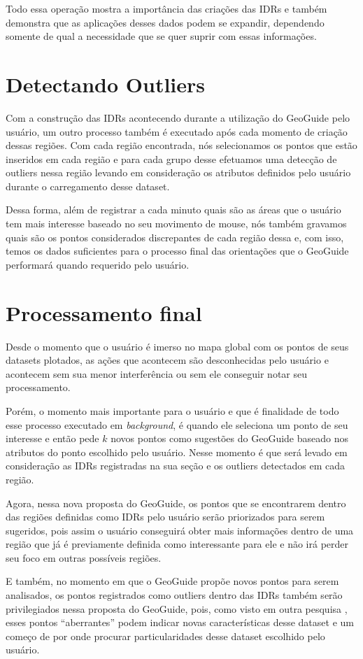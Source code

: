 Todo essa operação mostra a importância das criações das IDRs e também demonstra que as aplicações desses dados podem se expandir, dependendo somente de qual a necessidade que se quer suprir com essas informações.

\section{Detectando Outliers}

Com a construção das IDRs acontecendo durante a utilização do GeoGuide pelo usuário, um outro processo também é executado após cada momento de criação dessas regiões. Com cada região encontrada, nós selecionamos os pontos que estão inseridos em cada região e para cada grupo desse efetuamos uma detecção de outliers nessa região levando em consideração os atributos definidos pelo usuário durante o carregamento desse dataset.

Dessa forma, além de registrar a cada minuto quais são as áreas que o usuário tem mais interesse baseado no seu movimento de mouse, nós também gravamos quais são os pontos considerados discrepantes de cada região dessa e, com isso, temos os dados suficientes para o processo final das orientações que o GeoGuide performará quando requerido pelo usuário.

\section{Processamento final}

Desde o momento que o usuário é imerso no mapa global com os pontos de seus datasets plotados, as ações que acontecem são desconhecidas pelo usuário e acontecem sem sua menor interferência ou sem ele conseguir notar seu processamento.

Porém, o momento mais importante para o usuário e que é finalidade de todo esse processo executado em \textit{background}, é quando ele seleciona um ponto de seu interesse e então pede $k$ novos pontos como sugestões do GeoGuide baseado nos atributos do ponto escolhido pelo usuário. Nesse momento é que será levado em consideração as IDRs registradas na sua seção e os outliers detectados em cada região.

Agora, nessa nova proposta do GeoGuide, os pontos que se encontrarem dentro das regiões definidas como IDRs pelo usuário serão priorizados para serem sugeridos, pois assim o usuário conseguirá obter mais informações dentro de uma região que já é previamente definida como interessante para ele e não irá perder seu foco em outras possíveis regiões.

E também, no momento em que o GeoGuide propõe novos pontos para serem analisados, os pontos registrados como outliers dentro das IDRs também serão privilegiados nessa proposta do GeoGuide, pois, como visto em outra pesquisa \cite{DBLP:journals/debu/FreireCVZ16}, esses pontos ``aberrantes'' podem indicar novas características desse dataset e um começo de por onde procurar particularidades desse dataset escolhido pelo usuário.
